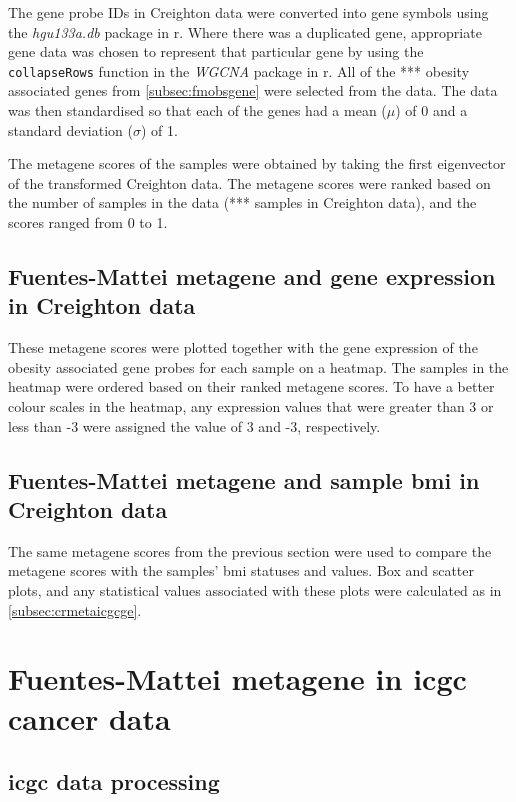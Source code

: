 The gene probe IDs in Creighton data were converted into gene symbols using the \textit{hgu133a.db} package in \gls{r}.
Where there was a duplicated gene, appropriate gene data was chosen to represent that particular gene by using the \texttt{collapseRows} function in the \textit{WGCNA} package in \gls{r}.
All of the *** obesity associated genes from  \cref{subsec:fmobsgene} were selected from the data.
The data was then standardised so that each of the genes had a mean ($\mu$) of 0 and a standard deviation ($\sigma$) of 1.

The \gls{metagene} scores of the samples were obtained by taking the first eigenvector of the transformed Creighton data.
The \gls{metagene} scores were ranked based on the number of samples in the data (*** samples in Creighton data), and the scores ranged from 0 to 1.

\subsection{Fuentes-Mattei metagene and gene expression in Creighton data}
\label{subsec:fmmetage}

These \gls{metagene} scores were plotted together with the gene expression of the obesity associated gene probes for each sample on a heatmap.
The samples in the heatmap were ordered based on their ranked \gls{metagene} scores.
To have a better colour scales in the heatmap, any expression values that were greater than 3 or less than -3 were assigned the value of 3 and -3, respectively.

\subsection{Fuentes-Mattei metagene and sample \gls{bmi} in Creighton data}
\label{subsec:fmmetabmi}

The same \gls{metagene} scores from the previous section were used to compare the \gls{metagene} scores with the samples' \gls{bmi} statuses and values.
Box and scatter plots, and any statistical values associated with these plots were calculated as in \cref{subsec:crmetaicgcge}.

\section{Fuentes-Mattei metagene in \gls{icgc} cancer data}
\label{sec:fmmetaicgc}

\subsection{\gls{icgc} data processing}
\label{subsec:datprocicgcfm}

